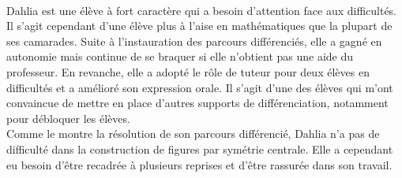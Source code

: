 \paragraph{}Dahlia est une élève à fort caractère qui a besoin d'attention face aux difficultés. Il s'agit cependant d'une élève plus à l'aise en mathématiques que la plupart de ses camarades. Suite à l'instauration des parcours différenciés, elle a gagné en autonomie mais continue de se braquer si elle n'obtient pas une aide du professeur. En revanche, elle a adopté le rôle de tuteur pour deux élèves en difficultés et a amélioré son expression orale. Il s'agit d'une des élèves qui m'ont convaincue de mettre en place d'autres supports de différenciation, notamment pour débloquer les élèves.\\
Comme le montre la résolution de son parcours différencié, Dahlia n'a pas de difficulté dans la construction de figures par symétrie centrale. Elle a cependant eu besoin d'être recadrée à plusieurs reprises et d'être rassurée dans son travail.
